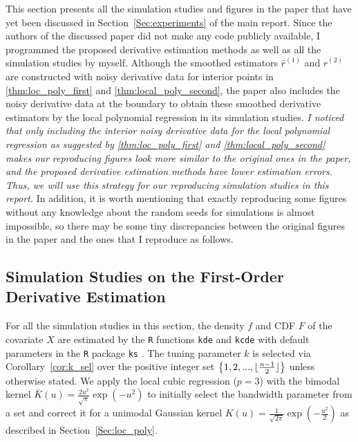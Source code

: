 \documentclass{uwstat572}
\theoremstyle{definition}
\DeclarePairedDelimiter\floor{\lfloor}{\rfloor}
\renewcommand{\hat}{\widehat}
\theoremstyle{theorem}
\begin{document}
This section presents all the simulation studies and figures in the paper \citep{liu2020smoothed} that have yet been discussed in Section~\ref{Sec:experiments} of the main report. Since the authors of the discussed paper did not make any code publicly available, I programmed the proposed derivative estimation methods as well as all the simulation studies by myself. Although the smoothed estimators $\hat{r}^{(1)}$ and $\hat{r}^{(2)}$ are constructed with noisy derivative data for interior points in \autoref{thm:loc_poly_first} and \autoref{thm:local_poly_second}, the paper also includes the noisy derivative data at the boundary to obtain these smoothed derivative estimators by the local polynomial regression in its simulation studies. \emph{I noticed that only including the interior noisy derivative data for the local polynomial regression as suggested by \autoref{thm:loc_poly_first} and \autoref{thm:local_poly_second} makes our reproducing figures look more similar to the original ones in the paper, and the proposed derivative estimation methods have lower estimation errors. Thus, we will use this strategy for our reproducing simulation studies in this report.} In addition, it is worth mentioning that exactly reproducing some figures without any knowledge about the random seeds for simulations is almost impossible, so there may be some tiny discrepancies between the original figures in the paper and the ones that I reproduce as follows.

\subsection{Simulation Studies on the First-Order Derivative Estimation}

For all the simulation studies in this section, the density $f$ and CDF $F$ of the covariate $X$ are estimated by the \texttt{R} functions \texttt{kde} and \texttt{kcde} with default parameters in the \texttt{R} package \texttt{ks} \citep{ks2022R}. The tuning parameter $k$ is selected via Corollary~\ref{cor:k_sel} over the positive integer set $\left\{1,2,...,\floor{\frac{n-1}{2}}\right\}$ unless otherwise stated. We apply the local cubic regression ($p=3$) with the bimodal kernel $\bar{K}(u)=\frac{2u^2}{\sqrt{\pi}} \exp\left(-u^2\right)$ to initially select the bandwidth parameter from a set and correct it for a unimodal Gaussian kernel $K(u)=\frac{1}{\sqrt{2\pi}} \exp\left(-\frac{u^2}{2}\right)$ as described in Section~\ref{Sec:loc_poly}.
\end{document}
